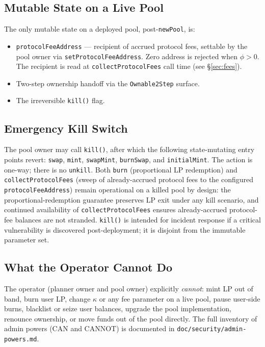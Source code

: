 \documentclass[11pt]{article}
\begin{document}
\subsection{Mutable State on a Live Pool}

The only mutable state on a deployed pool, post-\texttt{newPool}, is:

\begin{itemize}
  \item \texttt{protocolFeeAddress} --- recipient of accrued protocol fees,
        settable by the pool owner via \texttt{setProtocolFeeAddress}. Zero
        address is rejected when $\phi > 0$. The recipient is read at
        \texttt{collectProtocolFees} call time (see \S\ref{sec:fees}).
  \item Two-step ownership handoff via the \texttt{Ownable2Step} surface.
  \item The irreversible \texttt{kill()} flag.
\end{itemize}

\subsection{Emergency Kill Switch}

The pool owner may call \texttt{kill()}, after which the following
state-mutating entry points revert: \texttt{swap}, \texttt{mint},
\texttt{swapMint}, \texttt{burnSwap}, and \texttt{initialMint}. The
action is one-way; there is no \texttt{unkill}.
Both \texttt{burn} (proportional LP redemption) and
\texttt{collectProtocolFees} (sweep of already-accrued protocol fees to
the configured \texttt{protocolFeeAddress}) remain operational on a
killed pool by design: the proportional-redemption guarantee preserves
LP exit under any kill scenario, and continued availability of
\texttt{collectProtocolFees} ensures already-accrued protocol-fee
balances are not stranded. \texttt{kill()} is intended for incident
response if a critical vulnerability is discovered post-deployment; it is
disjoint from the immutable parameter set.

\subsection{What the Operator Cannot Do}

The operator (planner owner and pool owner) explicitly \emph{cannot}:
mint LP out of band, burn user LP, change $\kappa$ or any fee parameter on
a live pool, pause user-side burns, blacklist or seize user balances, upgrade
the pool implementation, renounce ownership, or move funds out of the pool
directly. The full inventory of admin powers (CAN and CANNOT) is documented
in \texttt{doc/security/admin-powers.md}.
\end{document}
